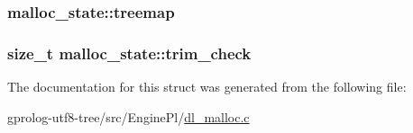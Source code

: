 \subsubsection[{\texorpdfstring{treemap}{treemap}}]{ malloc\+\_\+state\+::treemap}\hypertarget{structmalloc__state_ae20bf1bcda1838e5bc07d2395ba72283}{}\label{structmalloc__state_ae20bf1bcda1838e5bc07d2395ba72283}
\subsubsection[{\texorpdfstring{trim\+\_\+check}{trim_check}}]{\setlength{\rightskip}{0pt plus 5cm}size\+\_\+t malloc\+\_\+state\+::trim\+\_\+check}\hypertarget{structmalloc__state_a30209a5277132d0f207c7a850d225324}{}\label{structmalloc__state_a30209a5277132d0f207c7a850d225324}


The documentation for this struct was generated from the following file\+:\begin{DoxyCompactItemize}
\item 
gprolog-\/utf8-\/tree/src/\+Engine\+Pl/\hyperlink{dl__malloc_8c}{dl\+\_\+malloc.\+c}\end{DoxyCompactItemize}

